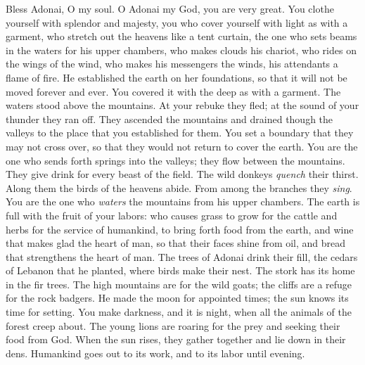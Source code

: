 \begin{biblechapter} %
 Bless Adonai, O my soul. 
O Adonai my God, you are very great. 
You clothe yourself with splendor and majesty,
\verse you who cover yourself with light as with a garment, 
who stretch out the heavens like a tent curtain,
\verse the one who sets beams in the waters for his upper chambers, 
who makes clouds his chariot, 
who rides on the wings of the wind,
\verse who makes his messengers the winds, 
his attendants a flame of fire.
\verse He established the earth on her foundations, 
so that it will not be moved forever and ever.
\verse You covered it with the deep as with a garment. 
The waters stood above the mountains.
\verse At your rebuke they fled; 
at the sound of your thunder they ran off.
\verse They ascended the mountains and drained though the valleys 
to the place that you established for them.
\verse You set a boundary that they may not cross over, 
so that they would not return to cover the earth.
\verse You are the one who sends forth springs into the valleys; 
they flow between the mountains.
\verse They give drink for every beast of the field. 
The wild donkeys \textit{quench} their thirst.
\verse Along them the birds of the heavens abide. 
From among the branches they \textit{sing}.
\verse You are the one who \textit{waters} the mountains 
from his upper chambers. 
The earth is full with the fruit of your labors:
\verse who causes grass to grow for the cattle 
and herbs for the service of humankind, 
to bring forth food from the earth,
\verse and wine that makes glad the heart of man, 
so that their faces shine from oil, 
and bread that strengthens the heart of man.
\verse The trees of Adonai drink their fill, 
the cedars of Lebanon that he planted,
\verse where birds make their nest. 
The stork has its home in the fir trees.
\verse The high mountains are for the wild goats; 
the cliffs are a refuge for the rock badgers.
\verse He made the moon for appointed times; 
the sun knows its time for setting.
\verse You make darkness, and it is night, 
when all the animals of the forest creep about.
\verse The young lions are roaring for the prey 
and seeking their food from God.
\verse When the sun rises, they gather together 
and lie down in their dens.
\verse Humankind goes out to its work, 
and to its labor until evening.

\end{biblechapter}
